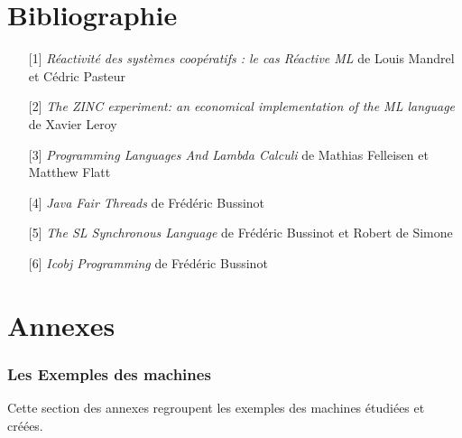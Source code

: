 \documentclass[10pt,a4paper]{report}
\begin{document}
	
	
	\chapter*{Bibliographie}\label{biblio}
	
	\begin{itemize}
		\item[] [1] \textit{Réactivité des systèmes coopératifs : le cas Réactive ML} de Louis Mandrel et Cédric Pasteur\label{ReactiveML}
		\item[] [2] \textit{The ZINC experiment: an economical implementation of the ML language} de Xavier Leroy\label{ZINC}
		\item[] [3] \textit{Programming Languages And Lambda Calculi} de Mathias Felleisen et Matthew Flatt\label{Calculi}
		\item[] [4] \textit{Java Fair Threads} de Frédéric Bussinot \label{FT} 
		\item[] [5] \textit{The SL Synchronous Language} de Frédéric Bussinot et Robert de Simone \label{SL}
		\item[] [6] \textit{Icobj Programming} de Frédéric Bussinot \label{IJ}
	\end{itemize}
	
	\chapter*{Annexes}
	
	\subsection*{Les Exemples des machines}
	
	Cette section des annexes regroupent les exemples des machines étudiées et créées.
	
\end{document}
